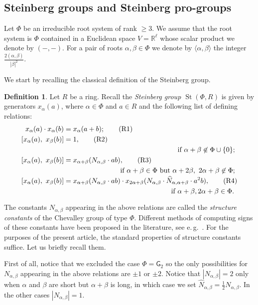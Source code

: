 \documentclass{article}
\numberwithin{equation}{section}
\theoremstyle{definition}
\newtheorem{df}[lemma]{Definition} \Crefname{df}{Definition}{Definitions}
\theoremstyle{remark}
\DeclareMathOperator\St{St}
\begin{document}
\subsection{Steinberg groups and Steinberg pro-groups}
Let $\Phi$ be an irreducible root system of rank $\geq 3$.
We assume that the root system is $\Phi$ contained in a Euclidean space $V = \mathbb{R}^\ell$ whose scalar product we denote by $(-, -)$.
For a pair of roots $\alpha, \beta \in \Phi$ we denote by $\langle \alpha, \beta \rangle$ the integer $\tfrac{2(\alpha, \beta)}{|\beta|^2}$.

We start by recalling the classical definition of the Steinberg group.
\begin{df} \label{def:Steinberg}
Let $R$ be a ring. Recall the {\it Steinberg group $\St(\Phi, R)$} is given by generators $x_\alpha(a)$, where $\alpha \in \Phi$ and $a \in R$ and the following list of defining relations:
\begin{align}
 x_\alpha(a) \cdot x_\alpha(b)    &= x_\alpha(a+b); \tag{R1} \label{R1} \\
 [x_\alpha(a),\ x_\beta(b)] &= 1, \tag{R2} \label{R2} \\ 
 \multispan2{\hfil if $\alpha + \beta \not\in\Phi \cup \{0\};$} \nonumber \\
 [x_\alpha(a),\ x_\beta(b)] &= x_{\alpha + \beta}(N_{\alpha,\beta} \cdot ab), \tag{R3} \label{R3} \\
 \multispan2{\hfill if $\alpha+\beta\in\Phi$ but $\alpha+2\beta,\ 2\alpha+\beta\not\in\Phi;$} \nonumber \\
 [x_\alpha(a),\ x_\beta(b)] &= x_{\alpha + \beta}(N_{\alpha,\beta} \cdot ab) \cdot x_{2\alpha+\beta}(N_{\alpha,\beta} \cdot \widehat{N}_{\alpha, \alpha+\beta}\cdot a^2b), \tag{R4} \label{R4} \\ \multispan2{ \hfill if $\alpha+\beta,2\alpha+\beta\in\Phi$.} \nonumber  \end{align}
\end{df}
The constants $N_{\alpha,\beta}$ appearing in the above relations are called the {\it structure constants} of the Chevalley group of type $\Phi$.
Different methods of computing signs of these constants have been proposed in the literature, see e.\,g.~\cite{VP}.
For the purposes of the present article, the standard properties of structure constants suffice. Let us briefly recall them.

First of all, notice that we excluded the case $\Phi=\mathsf{G}_2$ so the only possibilities for $N_{\alpha, \beta}$ appearing in the above relations are $\pm 1$ or $\pm 2$.
Notice that $|N_{\alpha,\beta}| = 2$ only when $\alpha$ and $\beta$ are short but $\alpha+\beta$ is long, in which case we set $\widehat{N}_{\alpha, \beta} = \frac{1}{2} N_{\alpha, \beta}$.
In the other cases $|N_{\alpha, \beta}| = 1$.
\end{document}
